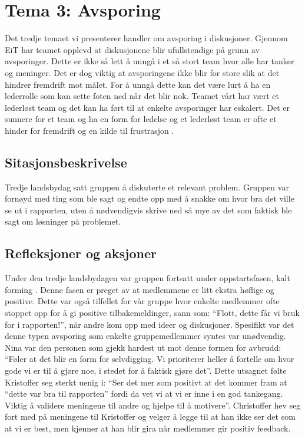 \chapter{Tema 3: Avsporing}

Det tredje temaet vi presenterer handler om avsporing i diskusjoner. Gjennom EiT har teamet opplevd at diskusjonene
blir ufullstendige på grunn av avsporinger. Dette er ikke så lett å unngå i et så stort team hvor alle har tanker og meninger.
Det er dog viktig at avsporingene ikke blir for store slik at det hindrer fremdrift mot målet. For å unngå dette kan det være lurt
å ha en lederrolle som kan sette foten ned når det blir nok. Teamet vårt har vært et lederløst team og det kan ha ført til at 
enkelte avsporinger har eskalert. Det er sunnere for et team og ha en form for ledelse og et lederløst team er ofte et hinder for 
fremdrift og en kilde til frustrasjon \cite{Artikkel4}.

\section{Sitasjonsbeskrivelse}

Tredje landsbydag satt gruppen å diskuterte et relevant problem. Gruppen var fornøyd med ting som ble sagt og endte opp med å 
snakke om hvor bra det ville se ut i rapporten, uten å nødvendigvis skrive ned så mye av det som faktisk ble sagt om løsninger på 
problemet.

\section{Refleksjoner og aksjoner}

Under den tredje landsbydagen var gruppen fortsatt under oppstartsfasen, kalt forming \cite{forming}. Denne fasen er preget av at medlemmene er 
litt ekstra høflige og positive. Dette var også tilfellet for vår gruppe hvor enkelte medlemmer ofte stoppet opp for å gi positive 
tilbakemeldinger, sann som: ``Flott, dette får vi bruk for i rapporten!'', når andre kom opp med ideer og diskusjoner. Spesifikt var det 
denne typen avsporing som enkelte gruppemedlemmer syntes var unødvendig. Nina var den personen som gjekk hardest ut mot 
denne formen for avbrudd: ``Føler at det blir en form for selvdigging. Vi prioriterer heller å fortelle om hvor gode vi er til å gjøre noe, i 
stedet for å faktisk gjøre det''. Dette utsagnet følte Kristoffer seg sterkt uenig i: ``Ser det mer som positivt at det kommer fram at ``dette 
var bra til rapporten'' fordi da vet vi at vi er inne i en god tankegang. Viktig å validere meningene til andre og hjelpe til å motivere''. 
Christoffer hev seg fort med på meningene til Kristoffer og velger å legge til at han ikke ser det som at vi er best, men kjenner at han 
blir gira når medlemmer gir positiv feedback. 

